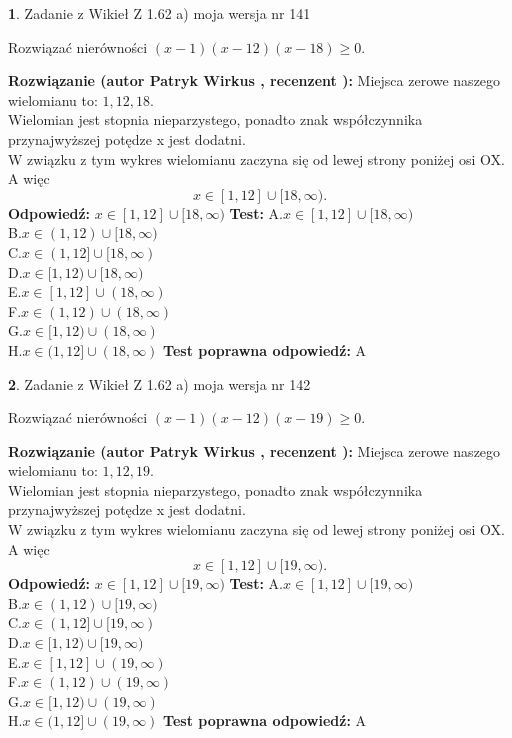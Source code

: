 \documentclass[12pt, a4paper]{article}
\theoremstyle{definition} %
\newtheorem{zad}{}
\newcommand{\zadStart}[1]{\begin{zad}#1\newline}
\newcommand{\zadStop}{\end{zad}}
\newcommand{\rozwStart}[2]{\noindent \textbf{Rozwiązanie (autor #1 , recenzent #2): }\newline}
\newcommand{\rozwStop}{\newline}
\newcommand{\odpStart}{\noindent \textbf{Odpowiedź:}\newline}
\newcommand{\odpStop}{\newline}
\newcommand{\testStart}{\noindent \textbf{Test:}\newline}
\newcommand{\testStop}{\newline}
\newcommand{\kluczStart}{\noindent \textbf{Test poprawna odpowiedź:}\newline}
\newcommand{\kluczStop}{\newline}
\begin{document}
\zadStart{Zadanie z Wikieł Z 1.62 a) moja wersja nr 141}

Rozwiązać nierówności $(x-1)(x-12)(x-18)\ge0$.
\zadStop
\rozwStart{Patryk Wirkus}{}
Miejsca zerowe naszego wielomianu to: $1, 12, 18$.\\
Wielomian jest stopnia nieparzystego, ponadto znak współczynnika przy\linebreak najwyższej potędze x jest dodatni.\\ W związku z tym wykres wielomianu zaczyna się od lewej strony poniżej osi OX. A więc $$x \in [1,12] \cup [18,\infty).$$
\rozwStop
\odpStart
$x \in [1,12] \cup [18,\infty)$
\odpStop
\testStart
A.$x \in [1,12] \cup [18,\infty)$\\
B.$x \in (1,12) \cup [18,\infty)$\\
C.$x \in (1,12] \cup [18,\infty)$\\
D.$x \in [1,12) \cup [18,\infty)$\\
E.$x \in [1,12] \cup (18,\infty)$\\
F.$x \in (1,12) \cup (18,\infty)$\\
G.$x \in [1,12) \cup (18,\infty)$\\
H.$x \in (1,12] \cup (18,\infty)$
\testStop
\kluczStart
A
\kluczStop



\zadStart{Zadanie z Wikieł Z 1.62 a) moja wersja nr 142}

Rozwiązać nierówności $(x-1)(x-12)(x-19)\ge0$.
\zadStop
\rozwStart{Patryk Wirkus}{}
Miejsca zerowe naszego wielomianu to: $1, 12, 19$.\\
Wielomian jest stopnia nieparzystego, ponadto znak współczynnika przy\linebreak najwyższej potędze x jest dodatni.\\ W związku z tym wykres wielomianu zaczyna się od lewej strony poniżej osi OX. A więc $$x \in [1,12] \cup [19,\infty).$$
\rozwStop
\odpStart
$x \in [1,12] \cup [19,\infty)$
\odpStop
\testStart
A.$x \in [1,12] \cup [19,\infty)$\\
B.$x \in (1,12) \cup [19,\infty)$\\
C.$x \in (1,12] \cup [19,\infty)$\\
D.$x \in [1,12) \cup [19,\infty)$\\
E.$x \in [1,12] \cup (19,\infty)$\\
F.$x \in (1,12) \cup (19,\infty)$\\
G.$x \in [1,12) \cup (19,\infty)$\\
H.$x \in (1,12] \cup (19,\infty)$
\testStop
\kluczStart
A
\kluczStop
\end{document}
